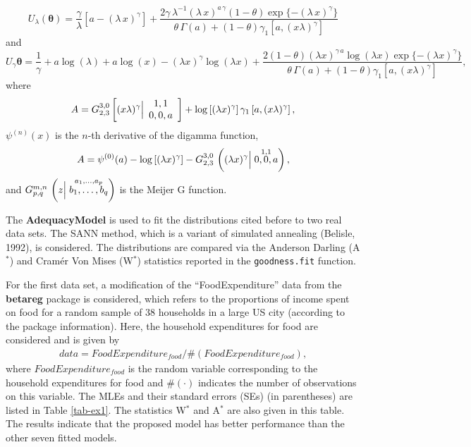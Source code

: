 \documentclass[12pt,a4paper]{article} %
\begin{document}
\begin{equation*}
U_{\lambda}(\boldsymbol{\theta})=\frac{\gamma }{\lambda }\left[a-(\lambda\,x)^\gamma\right]+\frac{2 \gamma \,\lambda^{-1}(\lambda\,x)^{a\,\gamma} (1-\theta )\exp\{-(\lambda\,x)^\gamma\} }{\theta \,\Gamma(a)+(1-\theta )
   \gamma_1 \left[a,(x \lambda )^{\gamma }\right]}
\end{equation*}
and
\begin{equation*}		
U_{\gamma}\boldsymbol{\theta}=\frac{1}{\gamma }+a \log (\lambda )+a \log (x)-(\lambda  x)^{\gamma } \log
   (\lambda  x)+\frac{2 (1-\theta )(\lambda
   x)^{\gamma\,a } \log (\lambda  x)\exp\{-(\lambda  x)^{\gamma }\}  }{\theta \,\Gamma(a)+(1-\theta )
   \gamma_1 \left[a,(x \lambda )^{\gamma }\right]},
\end{equation*}
where
\begin{align*}
A=G_{2,3}^{3,0}\left[(x \lambda )^{\gamma }\Big{|}
\begin{array}{c}
 1,1 \\
 0,0,a \\
\end{array}
\right]+\log \left[(\lambda  x)^{\gamma }\right] \gamma_1 \left[a,(x \lambda )^{\gamma
   }\right],
\end{align*}
$\psi^{(n)}(x)$ is the $n$-th derivative of the digamma function,
\begin{eqnarray*}
A=\psi^{(0)}(a) - \log\left[(\lambda x)^{\gamma}\right]-G^{3,0}_{2,3}\,\left((\lambda x)^{\gamma} \Big{|}	\stackrel{1,1}{0,0,a}\right),
\end{eqnarray*}
and $G^{m,n}_{p,q}\,\left(z \Big{|}	\stackrel{a_{1},\ldots,a_{p}}{b_{1},\ldots,b_{q}}\right)$ is the Meijer G function.

The {\bf AdequacyModel} is used to fit the distributions cited before to two real data sets. The SANN method, which is a
variant of simulated annealing (Belisle, 1992), is considered. The distributions are compared via the Anderson
Darling (A$^{*}$) and Cram\'er Von Mises (W$^{*}$) statistics reported in the {\tt goodness.fit} function.

For the first data set, a modification of the ``FoodExpenditure'' data from the {\bf betareg} package  is considered, which refers
to the proportions of income spent on food for a random sample of 38 households in a large US city (according to the package information).
Here, the household expenditures for food are considered and is given by
\begin{eqnarray*}
data = FoodExpenditure_{food} / \#(FoodExpenditure_{food}),
\end{eqnarray*}
where $FoodExpenditure_{food}$ is the random variable corresponding to the household expenditures for food and $\#(\cdot)$ indicates the number of
observations on this variable. The MLEs and their standard errors (SEs) (in parentheses) are listed in Table \ref{tab-ex1}.
The statistics  W$^{*}$ and A$^{*}$ are also given in this table. The results indicate that the proposed model has better performance than the other
seven fitted models.
\end{document}
